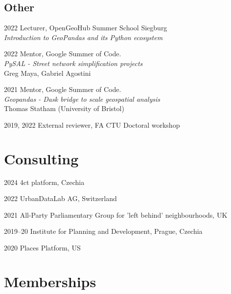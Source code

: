 \documentclass[12pt,a4paper]{report}
\begin{document}
    \subsection*{Other}

    \begin{tablist}

        \item[2022] \tab{}Lecturer, OpenGeoHub Summer School Siegburg \\
                          \textit{Introduction to GeoPandas and its Python ecosystem}

        \item[2022] \tab{}Mentor, Google Summer of Code. \\
                          \textit{PySAL - Street network simplification projects} \\
                          Greg Maya, Gabriel Agostini

        \item[2021] \tab{}Mentor, Google Summer of Code. \\
                          \textit{Geopandas - Dask bridge to scale geospatial analysis} \\
                          Thomas Statham (University of Bristol)

        \item[2019, 2022] \tab{}External reviewer, FA CTU Doctoral workshop

    \end{tablist}

    \section*{Consulting}

    \begin{tablist}

        \item[2024] \tab{}4ct platform, Czechia
        \item[2022] \tab{}UrbanDataLab AG, Switzerland
        \item[2021] \tab{}All-Party Parliamentary Group for 'left behind' neighbourhoods, UK
        \item[2019--20] \tab{}Institute for Planning and Development, Prague, Czechia
        \item[2020] \tab{}Places Platform, US

    \end{tablist}


    \section*{Memberships}
\end{document}

